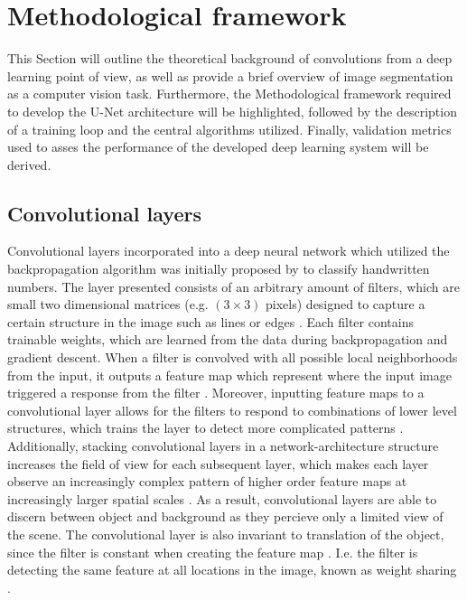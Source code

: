 \documentclass[../main/thesis.tex]{subfiles}
\begin{document}
\section{Methodological framework}
This Section will outline the theoretical background of convolutions from a deep learning point of view, as well as provide a brief overview of image segmentation as a computer vision task. Furthermore, the Methodological framework required to develop the U-Net architecture will be highlighted, followed by the description of a training loop and the central algorithms utilized. Finally, validation metrics used to asses the performance of the developed deep learning system will be derived.

\subsection{Convolutional layers}
\label{sec:convolutional-layer}
Convolutional layers incorporated into a deep neural network which utilized the backpropagation algorithm \citep{Rumelhart1986} was initially proposed by \citep{LeCun1989} to classify handwritten numbers. The layer \citet{LeCun1989} presented consists of an arbitrary amount of filters, which are small two dimensional matrices (e.g. $(3 \times 3)$ pixels) designed to capture a certain structure in the image such as lines or edges . Each filter contains trainable weights, which are learned from the data during backpropagation \citep{LeCun1989} and gradient descent. When a filter is convolved with all possible local neighborhoods from the input, it outputs a feature map which represent where the input image triggered a response from the filter \citep{Zeiler2010}. Moreover, inputting feature maps to a convolutional layer allows for the filters to respond to combinations of lower level structures, which trains the layer to detect more complicated patterns \citep{Fukushima1980}. Additionally, stacking convolutional layers in a network-architecture structure increases the field of view for each subsequent layer, which makes each layer observe an increasingly complex pattern of higher order feature maps at increasingly larger spatial scales \citep{Fukushima1980}. As a result, convolutional layers are able to discern between object and background as they percieve only a limited view of the scene. The convolutional layer is also invariant to translation of the object, since the filter is constant when creating the feature map \citep{LeCun1989}. I.e. the filter is detecting the same feature at all locations in the image, known as weight sharing \citep{LeCun1989}.
\end{document}
